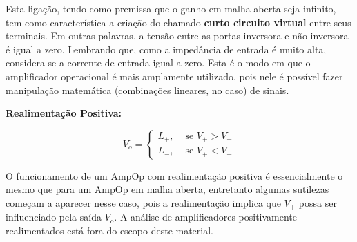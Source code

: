 \documentclass{article}
\numberwithin{equation}{section}
\begin{document}
Esta ligação, tendo como premissa que o ganho em malha aberta seja infinito, tem como característica a criação do chamado \textbf{curto circuito virtual} entre seus terminais. Em outras palavras, a tensão entre as portas inversora e não inversora é igual a zero. Lembrando que, como a impedância de entrada é muito alta, considera-se a corrente de entrada igual a zero. Esta é o modo em que o amplificador operacional é mais amplamente utilizado, pois nele é possível fazer manipulação matemática (combinações lineares, no caso) de sinais.

\vspace{5mm}

\noindent\textbf{Realimentação Positiva:}

\begin{center}
\end{center}

    \begin{center}
        \[V_o =
        \begin{cases}

            L_+,& \text{ se }  V_+>V_-\\ 

            L_-,& \text{ se }  V_+<V_-

        \end{cases}
        \]
    \end{center}
    
O funcionamento de um AmpOp com realimentação positiva é essencialmente o mesmo que para um AmpOp em malha aberta, entretanto algumas sutilezas começam a aparecer nesse caso, pois a realimentação implica que $V_+$ possa ser influenciado pela saída $V_o$. A análise de amplificadores positivamente realimentados está fora do escopo deste material.


\end{document}
